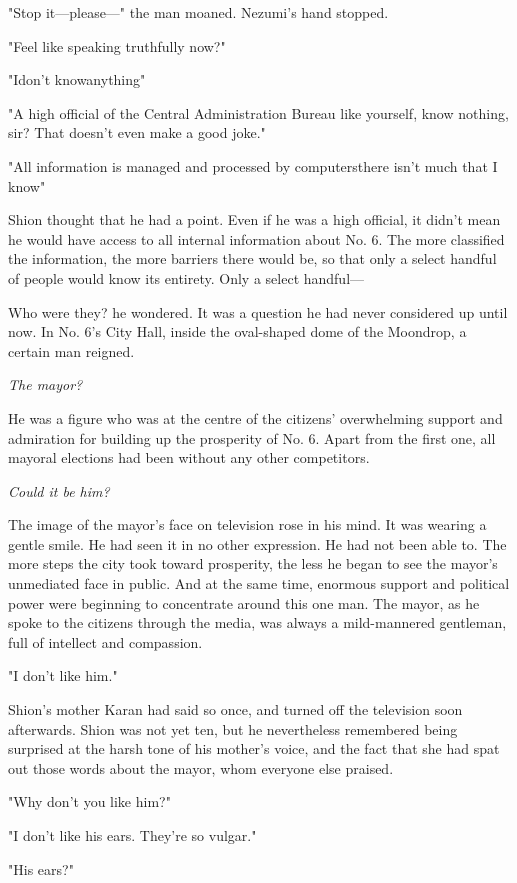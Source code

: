 "Stop it---please---" the man moaned. Nezumi's hand stopped.

"Feel like speaking truthfully now?"

"I\el don't know\el anything\el "

"A high official of the Central Administration Bureau like yourself,
know nothing, sir? That doesn't even make a good joke."

"All information is managed and processed by computers\el there isn't\el 
much that I know\el "

Shion thought that he had a point. Even if he was a high official, it
didn't mean he would have access to all internal information about No.
6. The more classified the information, the more barriers there would
be, so that only a select handful of people would know its entirety.
Only a select handful---

Who were they? he wondered. It was a question he had never considered up
until now. In No. 6's City Hall, inside the oval-shaped dome of the
Moondrop, a certain man reigned.

\emph{The mayor?}

He was a figure who was at the centre of the citizens' overwhelming
support and admiration for building up the prosperity of No. 6. Apart
from the first one, all mayoral elections had been without any other
competitors.

\emph{Could it be him?}

The image of the mayor's face on television rose in his mind. It was
wearing a gentle smile. He had seen it in no other expression. He had
not been able to. The more steps the city took toward prosperity, the
less he began to see the mayor's unmediated face in public. And at the
same time, enormous support and political power were beginning to
concentrate around this one man. The mayor, as he spoke to the citizens
through the media, was always a mild-mannered gentleman, full of
intellect and compassion.

"I don't like him."

Shion's mother Karan had said so once, and turned off the television
soon afterwards. Shion was not yet ten, but he nevertheless remembered
being surprised at the harsh tone of his mother's voice, and the fact
that she had spat out those words about the mayor, whom everyone else
praised.

"Why don't you like him?"

"I don't like his ears. They're so vulgar."

"His ears?"

